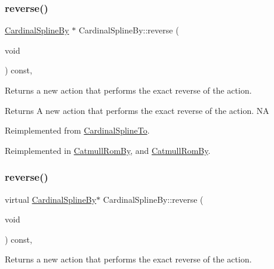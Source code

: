 \subsubsection{\texorpdfstring{reverse()}{reverse()}\hspace{0.1cm}{\footnotesize\ttfamily [1/2]}}
{\footnotesize\ttfamily \hyperlink{classCardinalSplineBy}{Cardinal\+Spline\+By} $\ast$ Cardinal\+Spline\+By\+::reverse (\begin{DoxyParamCaption}\item[{void}]{ }\end{DoxyParamCaption}) const\hspace{0.3cm}{\ttfamily [override]}, {\ttfamily [virtual]}}

Returns a new action that performs the exact reverse of the action.

\begin{DoxyReturn}{Returns}
A new action that performs the exact reverse of the action.  NA 
\end{DoxyReturn}


Reimplemented from \hyperlink{classCardinalSplineTo_aecb2ad46af2d58995820c9dfc1f6459f}{Cardinal\+Spline\+To}.



Reimplemented in \hyperlink{classCatmullRomBy_ab489930d039c543d5965637ed50420d3}{Catmull\+Rom\+By}, and \hyperlink{classCatmullRomBy_a2f027f2c6627f98ffcc75a64ff6b0cd0}{Catmull\+Rom\+By}.

\mbox{\label{classCardinalSplineBy_a565e7afdb1544698e29dda40a201ccae}} 
\subsubsection{\texorpdfstring{reverse()}{reverse()}\hspace{0.1cm}{\footnotesize\ttfamily [2/2]}}
{\footnotesize\ttfamily virtual \hyperlink{classCardinalSplineBy}{Cardinal\+Spline\+By}$\ast$ Cardinal\+Spline\+By\+::reverse (\begin{DoxyParamCaption}\item[{void}]{ }\end{DoxyParamCaption}) const\hspace{0.3cm}{\ttfamily [override]}, {\ttfamily [virtual]}}

Returns a new action that performs the exact reverse of the action.

